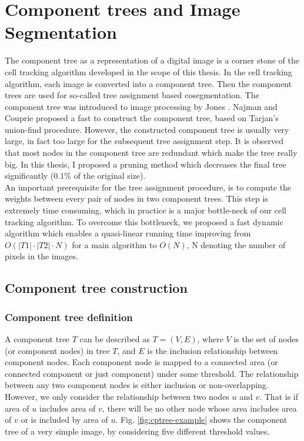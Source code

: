 \chapter{Component trees and Image Segmentation}\label{chapter:cptree} \label{chpt:cptree}
The component tree as a representation of a digital image is a corner stone of the cell tracking algorithm developed in the scope of this thesis. In the cell tracking algorithm, each image is converted into a component tree. Then the component trees are used for so-called tree assignment based cosegmentation. The component tree was introduced to image processing by Jones \cite{jones1999connected}. Najman and Couprie \cite{Najman:04,najman2006building} proposed a fast to construct the component tree, based on Tarjan's union-find procedure. However, the constructed component tree is usually very large, in fact too large for the subsequent tree assignment step. It is observed that most nodes in the component tree are redundant which make the tree really big. In this thesis, I proposed a pruning method which decreases the final tree significantly ($0.1\%$ of the original size).\\
An important prerequisite for the tree assignment procedure, is to compute the weights between every pair of nodes in two component trees. This step is extremely time consuming, which in practice is a major bottle-neck of our cell tracking algorithm. To overcome this bottleneck, we proposed a fast dynamic algorithm which enables a quasi-linear running time improving from $O(|T1|\cdot|T2|\cdot N)$ for a main algorithm to $O(N)$, N denoting the number of pixels in the images.
\section{Component tree construction} \label{sec:cptree-def}
\subsection{Component tree definition}
A component tree $T$ can be described as $T=(V, E)$, where $V$ is the set of nodes (or component nodes) in tree $T$, and $E$ is the inclusion relationship between component nodes. Each component node is mapped to a connected area (or connected component or just component) under some threshold. The relationship between any two component nodes is either inclusion or non-overlapping. However, we only consider the relationship between two nodes $u$ and $v$. That is if area of $u$ includes area of $v$, there will be no other node whose area includes area of $v$ or is included by area of $u$. Fig. \ref{fig:cptree-example} shows the component tree of a very simple image, by considering five different threshold values.

